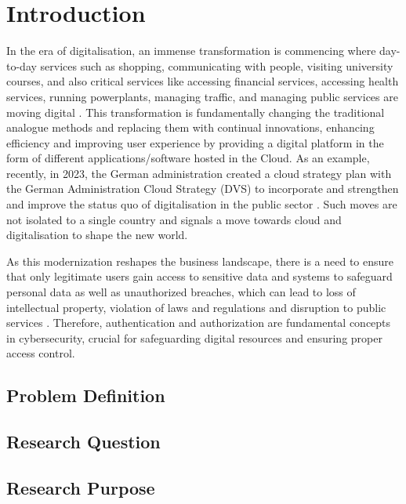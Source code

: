 \chapter{Introduction}
In the era of digitalisation, an immense transformation is commencing where day-to-day services such as shopping, communicating with people, visiting university courses, and also critical services like accessing financial services, accessing health services, running powerplants, managing traffic, and managing public services are moving digital \citep{intro_cloud_critical_infra}. This transformation is fundamentally changing the traditional analogue methods and replacing them with continual innovations, enhancing efficiency and improving user experience by providing a digital platform in the form of different applications/software hosted in the Cloud. As an example, recently, in 2023, the German administration created a cloud strategy plan with the German Administration Cloud Strategy (DVS) to incorporate and strengthen and improve the status quo of digitalisation in the public sector \citep{german_gov_cloud_plan}. Such moves are not isolated to a single country and signals a move towards cloud and digitalisation to shape the new world.

As this modernization reshapes the business landscape, there is a need to ensure that only legitimate users gain access to sensitive data and systems to safeguard personal data as well as unauthorized breaches, which can lead to loss of intellectual property, violation of laws and regulations and disruption to public services \citep{critical_infra_reason}. Therefore, authentication and authorization are fundamental concepts in cybersecurity, crucial for safeguarding digital resources and ensuring proper access control.

\section{Problem Definition}

\section{Research Question}

\section{Research Purpose}